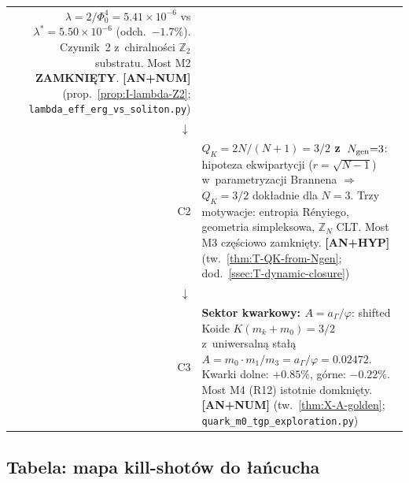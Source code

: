 \begin{center}
\begin{tabular}{@{}rl@{}}
       $\lambda = 2/\Phi_0^4 = 5.41 \times 10^{-6}$ vs
       $\lambda^* = 5.50 \times 10^{-6}$ (odch.\ $-1.7\%$).
       Czynnik~2 z~chiralno\'sci $\mathbb{Z}_2$ substratu.
       Most M2 \textbf{ZAMKNI\k{E}TY}.
       \textbf{[AN+NUM]}
       (prop.~\ref{prop:I-lambda-Z2}; \texttt{lambda\_eff\_erg\_vs\_soliton.py}) \\
$\downarrow$ & \\
C2 & \textbf{$Q_K = 2N/(N{+}1) = 3/2$ z~$N_{\rm gen}{=}3$}:
       hipoteza ekwipartycji ($r = \sqrt{N{-}1}$) w~parametryzacji
       Brannena $\Rightarrow$ $Q_K = 3/2$ dok\l{}adnie dla $N{=}3$.
       Trzy motywacje: entropia R\'enyiego, geometria simpleksowa,
       $\mathbb{Z}_N$ CLT. Most M3 cz\k{e}\'sciowo zamkni\k{e}ty.
       \textbf{[AN+HYP]}
       (tw.~\ref{thm:T-QK-from-Ngen}; dod.~\ref{ssec:T-dynamic-closure}) \\
$\downarrow$ & \\
C3 & \textbf{Sektor kwarkowy: $A = a_\Gamma/\varphi$}:
       shifted Koide $K(m_k + m_0) = 3/2$ z~uniwersaln\k{a} sta\l{}\k{a}
       $A = m_0 \cdot m_1 / m_3 = a_\Gamma/\varphi = 0.02472$.
       Kwarki dolne: $+0.85\%$, g\'orne: $-0.22\%$.
       Most M4 (R12) istotnie domkni\k{e}ty.
       \textbf{[AN+NUM]}
       (tw.~\ref{thm:X-A-golden}; \texttt{quark\_m0\_tgp\_exploration.py}) \\
\bottomrule
\end{tabular}
\end{center}

\subsection{Tabela: mapa kill-shot\'ow do \l{}a\'ncucha}%
\label{app:H-killshot-map}

